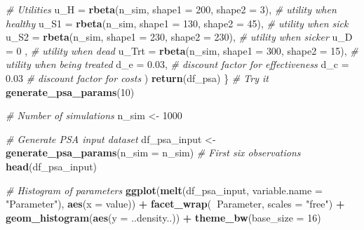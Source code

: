 \documentclass[
]{article}
\newenvironment{Shaded}{\begin{snugshade}}{\end{snugshade}}
\newcommand{\CommentTok}[1]{\textcolor[rgb]{0.56,0.35,0.01}{\textit{#1}}}
\newcommand{\DataTypeTok}[1]{\textcolor[rgb]{0.13,0.29,0.53}{#1}}
\newcommand{\DecValTok}[1]{\textcolor[rgb]{0.00,0.00,0.81}{#1}}
\newcommand{\FloatTok}[1]{\textcolor[rgb]{0.00,0.00,0.81}{#1}}
\newcommand{\KeywordTok}[1]{\textcolor[rgb]{0.13,0.29,0.53}{\textbf{#1}}}
\newcommand{\NormalTok}[1]{#1}
\newcommand{\OperatorTok}[1]{\textcolor[rgb]{0.81,0.36,0.00}{\textbf{#1}}}
\newcommand{\StringTok}[1]{\textcolor[rgb]{0.31,0.60,0.02}{#1}}
\begin{document}
\begin{Shaded}
\begin{Highlighting}[]
    \CommentTok{# Utilities}
    \DataTypeTok{u_H   =} \KeywordTok{rbeta}\NormalTok{(n_sim, }\DataTypeTok{shape1 =} \DecValTok{200}\NormalTok{, }\DataTypeTok{shape2 =} \DecValTok{3}\NormalTok{), }\CommentTok{# utility when healthy}
    \DataTypeTok{u_S1  =} \KeywordTok{rbeta}\NormalTok{(n_sim, }\DataTypeTok{shape1 =} \DecValTok{130}\NormalTok{, }\DataTypeTok{shape2 =} \DecValTok{45}\NormalTok{), }\CommentTok{# utility when sick}
    \DataTypeTok{u_S2  =} \KeywordTok{rbeta}\NormalTok{(n_sim, }\DataTypeTok{shape1 =} \DecValTok{230}\NormalTok{, }\DataTypeTok{shape2 =} \DecValTok{230}\NormalTok{), }\CommentTok{# utility when sicker}
    \DataTypeTok{u_D   =} \DecValTok{0}\NormalTok{                                               , }\CommentTok{# utility when dead}
    \DataTypeTok{u_Trt =} \KeywordTok{rbeta}\NormalTok{(n_sim, }\DataTypeTok{shape1 =} \DecValTok{300}\NormalTok{, }\DataTypeTok{shape2 =} \DecValTok{15}\NormalTok{), }\CommentTok{# utility when being treated}
    \DataTypeTok{d_e   =} \FloatTok{0.03}\NormalTok{,  }\CommentTok{# discount factor for effectiveness}
    \DataTypeTok{d_c   =} \FloatTok{0.03}   \CommentTok{# discount factor for costs}
\NormalTok{  )}
  \KeywordTok{return}\NormalTok{(df_psa)}
\NormalTok{\}}
\CommentTok{# Try it}
\KeywordTok{generate_psa_params}\NormalTok{(}\DecValTok{10}\NormalTok{) }

\CommentTok{# Number of simulations}
\NormalTok{n_sim <-}\StringTok{ }\DecValTok{1000}

\CommentTok{# Generate PSA input dataset}
\NormalTok{df_psa_input <-}\StringTok{ }\KeywordTok{generate_psa_params}\NormalTok{(}\DataTypeTok{n_sim =}\NormalTok{ n_sim)}
\CommentTok{# First six observations}
\KeywordTok{head}\NormalTok{(df_psa_input)}

\CommentTok{# Histogram of parameters}
\KeywordTok{ggplot}\NormalTok{(}\KeywordTok{melt}\NormalTok{(df_psa_input, }\DataTypeTok{variable.name =} \StringTok{"Parameter"}\NormalTok{), }\KeywordTok{aes}\NormalTok{(}\DataTypeTok{x =}\NormalTok{ value)) }\OperatorTok{+}
\StringTok{  }\KeywordTok{facet_wrap}\NormalTok{(}\OperatorTok{~}\NormalTok{Parameter, }\DataTypeTok{scales =} \StringTok{"free"}\NormalTok{) }\OperatorTok{+}
\StringTok{  }\KeywordTok{geom_histogram}\NormalTok{(}\KeywordTok{aes}\NormalTok{(}\DataTypeTok{y =}\NormalTok{ ..density..)) }\OperatorTok{+}
\StringTok{  }\KeywordTok{theme_bw}\NormalTok{(}\DataTypeTok{base_size =} \DecValTok{16}\NormalTok{)}


\end{Highlighting}
\end{Shaded}
\end{document}
